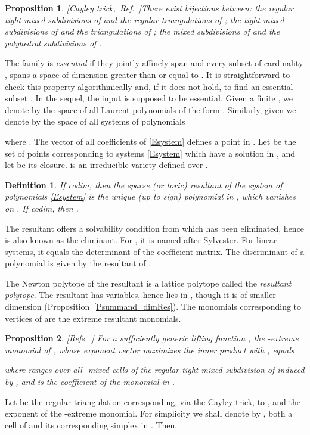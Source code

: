 \documentclass{article}
\newtheorem{proposition}{Proposition}
\newtheorem{definition}{Definition}
\newcommand\refcite[1]{\citealp{#1}} \newcommand\citess[1]{\textsuperscript{\textup{\citealp{#1}}}}
\begin{document}
\begin{proposition}{\rm [Cayley
trick,~Ref.~\refcite{GKZ}]}\label{P:Cayley_trick}
There exist bijections between:
the regular tight mixed subdivisions of  and
the regular triangulations of ;
the tight mixed subdivisions of  and the triangulations of ;
the mixed subdivisions of  and the polyhedral subdivisions of . 
\end{proposition} 

The family  is \textit{essential}
if they jointly affinely span  and every subset
of cardinality , spans a space of dimension greater than or equal to .
It is straightforward to check this property algorithmically and, if it
does not hold, to find an essential subset \citess{St94}. 
In the sequel, the input  is supposed
to be essential. 
Given a finite , we denote by  the space of all Laurent polynomials
of the form .
Similarly, given  we denote by 
the space of all systems of polynomials

where .
The vector of all coefficients  of \eqref{Esystem} defines 
a point in .
Let  be the set of points corresponding to 
systems \eqref{Esystem} which have a solution in ,
and let  be its closure.  is an irreducible variety defined over .  

\begin{definition}\label{Dresultant}
If {\rm codim}, then the
\textit{sparse (or toric) resultant} of the system of polynomials \eqref{Esystem} 
is the unique (up to sign)
polynomial  in   ,
which vanishes on .
If {\rm codim}, then .
\end{definition}

The resultant offers a solvability condition from which 
has been eliminated, hence is also known as the eliminant. 
For , it is named after Sylvester.
For linear systems, it equals the determinant of the
 coefficient matrix.
The discriminant of a polynomial  is given by the resultant
of  .

The Newton polytope  of the resultant is a lattice polytope called the 
\textit{resultant polytope}. The resultant
has  variables, hence  lies in ,
though it is of smaller dimension (Proposition~\ref{Psummand_dimRes}).
The monomials corresponding to vertices of  are the
extreme resultant monomials.
\begin{proposition}{\rm [Refs.~\refcite{GKZ,St94}]} \label{PSturmf_extreme}
For a sufficiently generic lifting function , 
the -extreme monomial of , whose exponent vector 
maximizes the inner product with , equals

where  ranges over all -mixed cells of the regular tight mixed
subdivision  of  induced by , and  is the
coefficient of the monomial  in .
\end{proposition}
Let  be the regular triangulation corresponding, via the Cayley trick,
to , and  the exponent of the -extreme monomial.
For simplicity we shall denote by , both a cell of   and its 
corresponding simplex in . Then,
\end{document}
